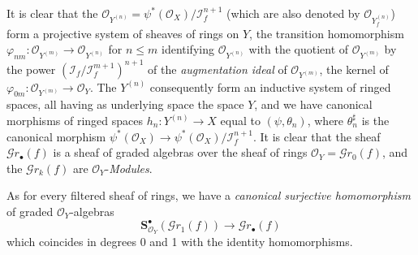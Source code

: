 It is clear that the
$\mathcal{O}_{Y^{(n)}}=\psi^*(\mathcal{O}_X)/\mathscr{I}_f^{n+1}$
(which are also denoted by $\mathcal{O}_{Y_f^{(n)}}$) form a
projective system of sheaves of rings on $Y$, the transition homomorphism
$\varphi_{nm}:\mathcal{O}_{Y^{(m)}}\to\mathcal{O}_{Y^{(n)}}$ for $n\leq m$
identifying $\mathcal{O}_{Y^{(n)}}$ with the quotient of $\mathcal{O}_{Y^{(m)}}$ by the
power $(\mathscr{I}_f/\mathscr{I}_f^{m+1})^{n+1}$ of the \emph{augmentation ideal} of
$\mathcal{O}_{Y^{(m)}}$, the kernel of
$\varphi_{0m}:\mathcal{O}_{Y^{(m)}}\to\mathcal{O}_Y$. The $Y^{(n)}$ consequently
form an inductive system of ringed spaces, all having as underlying space
the space $Y$, and we have canonical morphisms of ringed spaces
$h_n:Y^{(n)}\to X$ equal to $(\psi,\theta_n)$, where $\theta_n^\sharp$ is the
canonical morphism
$\psi^*(\mathcal{O}_X)\to\psi^*(\mathcal{O}_X)/\mathscr{I}_f^{n+1}$.
It is clear that the sheaf $\mathscr{G}r_\bullet(f)$ is a sheaf of graded
algebras over the sheaf of rings
$\mathcal{O}_Y=\mathscr{G}r_0(f)$, and the $\mathscr{G}r_k(f)$ are
$\mathcal{O}_Y$-\emph{Modules}.

As for every filtered sheaf of rings, we have a \emph{canonical surjective
homomorphism} of graded $\mathcal{O}_Y$-algebras
\[
  \mathbf{S}_{\mathcal{O}_Y}^{\bullet}(\mathscr{G}r_1(f))
  \longrightarrow\mathscr{G}r_\bullet(f)
  \tag{16.1.2.2}
  \label{IV.16.1.2.2}
\]
which coincides in degrees 0 and 1 with the identity homomorphisms.

